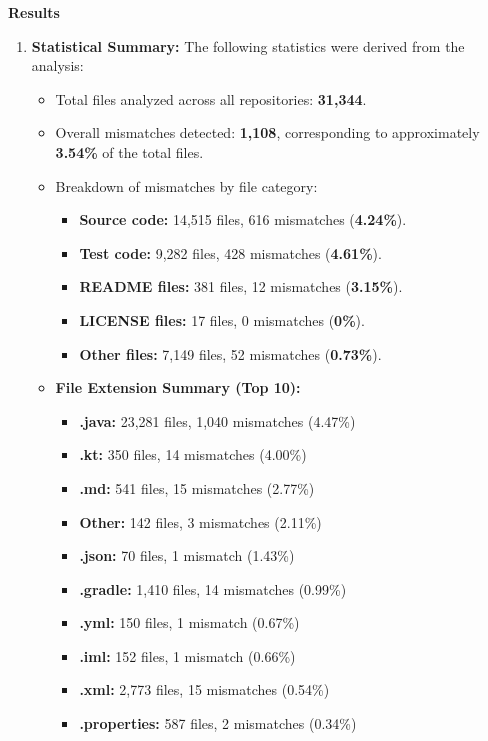 \documentclass[12pt, a4paper]{report}
\newcommand{\sectionbar}[1]{%
  \vspace{0.6\baselineskip}%
  \noindent
  \colorbox{sectionbar}{%
    \parbox{\dimexpr\linewidth-2\fboxsep\relax}{%
      \textbf{\Large\textsf{#1}}%
    }%
  }%
  \vspace{0.6\baselineskip}
}
\begin{document}
\sectionbar{Results}

\begin{enumerate}
    
    \item \textbf{Statistical Summary:}  
    The following statistics were derived from the analysis:
    \begin{itemize}
        \item Total files analyzed across all repositories: \textbf{31,344}.  
        \item Overall mismatches detected: \textbf{1,108}, corresponding to approximately \textbf{3.54\%} of the total files.  
        \item Breakdown of mismatches by file category:  
        \begin{itemize}
            \item \textbf{Source code:} 14,515 files, 616 mismatches (\textbf{4.24\%}).  
            \item \textbf{Test code:} 9,282 files, 428 mismatches (\textbf{4.61\%}).  
            \item \textbf{README files:} 381 files, 12 mismatches (\textbf{3.15\%}).  
            \item \textbf{LICENSE files:} 17 files, 0 mismatches (\textbf{0\%}).  
            \item \textbf{Other files:} 7,149 files, 52 mismatches (\textbf{0.73\%}).  
        \end{itemize}

        \item \textbf{File Extension Summary (Top 10):}  
            \begin{itemize}
                \item \textbf{.java:} 23,281 files, 1,040 mismatches (4.47\%)  
                \item \textbf{.kt:} 350 files, 14 mismatches (4.00\%)  
                \item \textbf{.md:} 541 files, 15 mismatches (2.77\%)  
                \item \textbf{Other:} 142 files, 3 mismatches (2.11\%)  
                \item \textbf{.json:} 70 files, 1 mismatch (1.43\%)  
                \item \textbf{.gradle:} 1,410 files, 14 mismatches (0.99\%)  
                \item \textbf{.yml:} 150 files, 1 mismatch (0.67\%)  
                \item \textbf{.iml:} 152 files, 1 mismatch (0.66\%)  
                \item \textbf{.xml:} 2,773 files, 15 mismatches (0.54\%)  
                \item \textbf{.properties:} 587 files, 2 mismatches (0.34\%)  
            \end{itemize}
    \end{itemize}


\end{enumerate}
\end{document}
